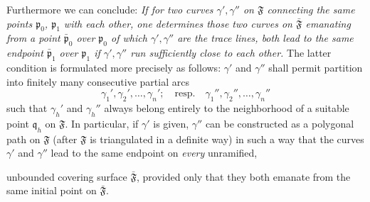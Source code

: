 \documentclass{article}
\begin{document}
Furthermore we can conclude: \emph{If for two curves $\gamma', \gamma''$ on $\mathfrak{F}$ connecting the same points $\mathfrak{p}_0$, $\mathfrak{p}_1$ with each other, one determines those two curves on $\bar{\mathfrak{F}}$ emanating from a point $\bar{\mathfrak{p}}_0$ over $\mathfrak{p}_0$ of which $\gamma', \gamma''$ are the trace lines, both lead to the same endpoint $\bar{\mathfrak{p}}_1$ over $\mathfrak{p}_1$ if $\gamma', \gamma''$ run sufficiently close to each other.} The latter condition is formulated more precisely as follows: $\gamma'$ and $\gamma''$ shall permit partition into finitely many consecutive partial arcs
\[ \gamma_1', \gamma_2', \dots, \gamma_n'; \quad \text{resp.} \quad \gamma_1'', \gamma_2'', \dots, \gamma_n'' \]
such that $\gamma_h'$ and $\gamma_h''$ always belong entirely to the neighborhood of a suitable point $\mathfrak{q}_h$ on $\mathfrak{F}$. In particular, if $\gamma'$ is given, $\gamma''$ can be constructed as a polygonal path on $\mathfrak{F}$ (after $\mathfrak{F}$ is triangulated in a definite way) in such a way that the curves $\gamma'$ and $\gamma''$ lead to the same endpoint on \emph{every} unramified,

unbounded covering surface $\bar{\mathfrak{F}}$, provided only that they both emanate from the same initial point on $\bar{\mathfrak{F}}$.
\end{document}
